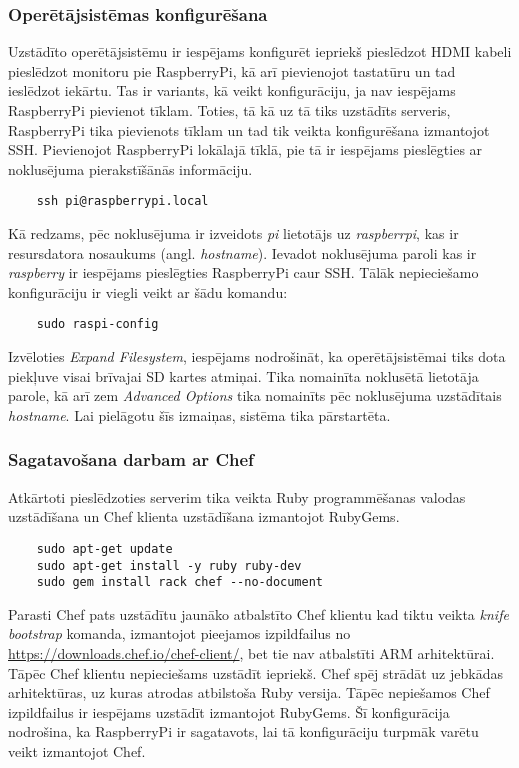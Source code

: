 \subsubsection{Operētājsistēmas konfigurēšana}
Uzstādīto operētājsistēmu ir iespējams konfigurēt iepriekš pieslēdzot HDMI kabeli pieslēdzot monitoru pie RaspberryPi, kā arī pievienojot tastatūru un tad ieslēdzot iekārtu. Tas ir variants, kā veikt konfigurāciju, ja nav iespējams RaspberryPi pievienot tīklam. Toties, tā kā uz tā tiks uzstādīts serveris, RaspberryPi tika pievienots tīklam un tad tik veikta konfigurēšana izmantojot SSH.
Pievienojot RaspberryPi lokālajā tīklā, pie tā ir iespējams pieslēgties ar noklusējuma pierakstīšānās informāciju.
\begin{lstlisting}
	ssh pi@raspberrypi.local
\end{lstlisting}
Kā redzams, pēc noklusējuma ir izveidots \textit{pi} lietotājs uz \textit{raspberrpi}, kas ir resursdatora nosaukums (angl. \textit{hostname}). Ievadot noklusējuma paroli kas ir \textit{raspberry} ir iespējams pieslēgties RaspberryPi caur SSH.
Tālāk nepieciešamo konfigurāciju ir viegli veikt ar šādu komandu:
\begin{lstlisting}
	sudo raspi-config
\end{lstlisting}
Izvēloties \textit{Expand Filesystem}, iespējams nodrošināt, ka operētājsistēmai tiks dota piekļuve visai brīvajai SD kartes atmiņai. Tika nomainīta noklusētā lietotāja parole, kā arī zem \textit{Advanced Options} tika nomainīts pēc noklusējuma uzstādītais \textit{hostname}.
Lai pielāgotu šīs izmaiņas, sistēma tika pārstartēta.

\subsubsection{Sagatavošana darbam ar Chef}
Atkārtoti pieslēdzoties serverim tika veikta Ruby programmēšanas valodas uzstādīšana un Chef klienta uzstādīšana izmantojot RubyGems.
\begin{lstlisting}
	sudo apt-get update
	sudo apt-get install -y ruby ruby-dev
	sudo gem install rack chef --no-document
\end{lstlisting}
Parasti Chef pats uzstādītu jaunāko atbalstīto Chef klientu kad tiktu veikta \textit{knife bootstrap} komanda, izmantojot pieejamos izpildfailus no \url{https://downloads.chef.io/chef-client/}, bet tie nav atbalstīti ARM arhitektūrai. Tāpēc Chef klientu nepieciešams uzstādīt iepriekš. Chef spēj strādāt uz jebkādas arhitektūras, uz kuras atrodas atbilstoša Ruby versija. Tāpēc nepiešamos Chef izpildfailus ir iespējams uzstādīt izmantojot RubyGems. Šī konfigurācija nodrošina, ka RaspberryPi ir sagatavots, lai tā konfigurāciju turpmāk varētu veikt izmantojot Chef.

